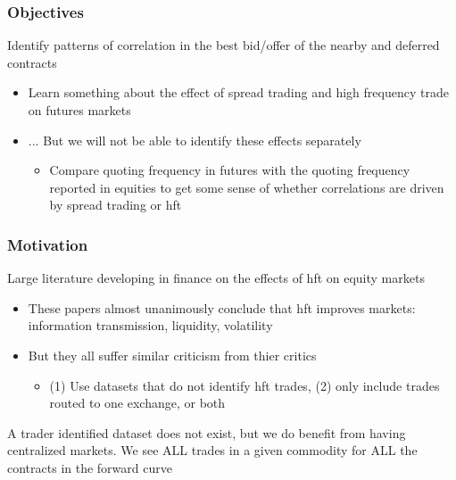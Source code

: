 \documentclass[t]{beamer}
\begin{document}
\begin{frame}
\frametitle{Objectives}
  Identify patterns of correlation in the best bid/offer of the nearby and deferred contracts
\begin{itemize}
     \item Learn something about the effect of spread trading and high frequency trade on futures markets 
    \item ... But we will not be able to identify these effects separately\\ 
    \begin{itemize}
    \item Compare quoting frequency in futures with the quoting frequency reported in equities to get some sense of whether correlations are driven by spread trading or hft
    \end{itemize}

  
\end{itemize}

\end{frame}
\begin{frame}
\frametitle{Motivation}
Large literature developing in finance on the effects of hft on equity markets
\begin{itemize}
  \item These papers almost unanimously conclude that hft improves markets: information transmission, liquidity, volatility
  \item But they all suffer similar criticism from thier critics
  \begin{itemize}
    \item (1) Use datasets that do not identify hft trades, (2) only include trades routed to one exchange, or both\\ \pause
  \end{itemize}
  
\end{itemize}

A trader identified dataset does not exist, but we do benefit from having centralized markets. \pause We see ALL trades in a given commodity for ALL the contracts in the forward curve

\end{frame}
\end{document}
